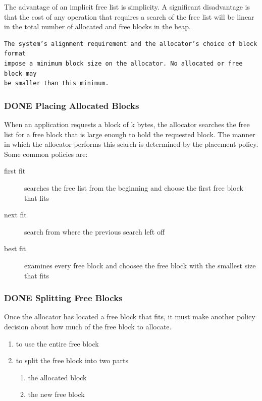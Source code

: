 \documentclass[11pt]{article}
\begin{document}
The advantage of an implicit free list is simplicity. A significant disadvantage is that the cost of any operation that requires a search of the free list will be linear in the total number of allocated and free blocks in the heap.\\

\begin{verbatim}
The system’s alignment requirement and the allocator’s choice of block format 
impose a minimum block size on the allocator. No allocated or free block may 
be smaller than this minimum. 
\end{verbatim}


\subsubsection{{\bfseries\sffamily DONE} Placing Allocated Blocks}
\label{sec:orgf089101}
When an application requests a block of k bytes, the allocator searches the free list for a free block that is large enough to hold the requested block. The manner in which the allocator performs this search is determined by the placement policy. Some common policies are:\\
\begin{description}
\item[{first fit}] searches the free list from the beginning and choose the first free block that fits\\
\item[{next fit}] search from where the previous search left off\\
\item[{best fit}] examines every free block and choosee the free block with the smallest size that fits\\
\end{description}

\subsubsection{{\bfseries\sffamily DONE} Splitting Free Blocks}
\label{sec:org5e98d61}
Once the allocator has located a free block that fits, it must make another policy decision about how much of the free block to allocate.\\
\begin{enumerate}
\item to use the entire free block\\
\item to split the free block into two parts\\
\begin{enumerate}
\item the allocated block\\
\item the new free block\\
\end{enumerate}
\end{enumerate}
\end{document}
